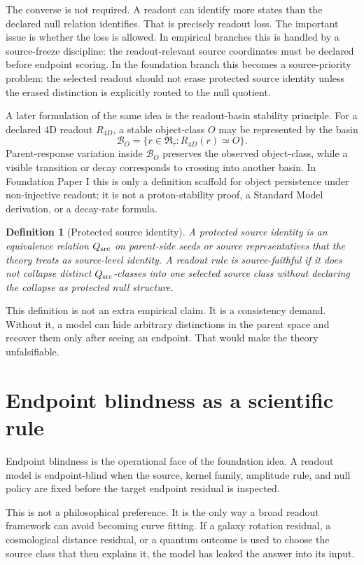 \documentclass[11pt]{article}
\newtheorem{definition}{Definition}
\newcommand{\RTspace}{\mathfrak R_{\tau}}
\begin{document}
The converse is not required.  A readout can identify more states than the
declared null relation identifies.  That is precisely readout loss.  The
important issue is whether the loss is allowed.  In empirical branches this is
handled by a source-freeze discipline: the readout-relevant source
coordinates must be declared before endpoint scoring.  In the foundation
branch this becomes a source-priority problem: the selected readout should not
erase protected source identity unless the erased distinction is explicitly
routed to the null quotient.

A later formulation of the same idea is the readout-basin stability principle.
For a declared 4D readout \(R_{4D}\), a stable object-class \(O\) may be
represented by the basin
\[
  \mathcal B_O=\{r\in\RTspace: R_{4D}(r)\simeq O\}.
\]
Parent-response variation inside \(\mathcal B_O\) preserves the observed
object-class, while a visible transition or decay corresponds to crossing into
another basin.  In Foundation Paper I this is only a definition scaffold for
object persistence under non-injective readout; it is not a proton-stability
proof, a Standard Model derivation, or a decay-rate formula.

\begin{definition}[Protected source identity]
A protected source identity is an equivalence relation \(Q_{\rm src}\) on
parent-side seeds or source representatives that the theory treats as
source-level identity.  A readout rule is source-faithful if it does not
collapse distinct \(Q_{\rm src}\)-classes into one selected source class
without declaring the collapse as protected null structure.
\end{definition}

This definition is not an extra empirical claim.  It is a consistency demand.
Without it, a model can hide arbitrary distinctions in the parent space and
recover them only after seeing an endpoint.  That would make the theory
unfalsifiable.

\section{Endpoint blindness as a scientific rule}

Endpoint blindness is the operational face of the foundation idea.  A readout
model is endpoint-blind when the source, kernel family, amplitude rule, and
null policy are fixed before the target endpoint residual is inspected.

This is not a philosophical preference.  It is the only way a broad readout
framework can avoid becoming curve fitting.  If a galaxy rotation residual, a
cosmological distance residual, or a quantum outcome is used to choose the
source class that then explains it, the model has leaked the answer into its
input.
\end{document}
